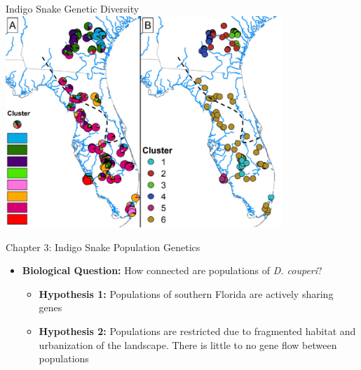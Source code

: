 \documentclass[10pt,aspectratio=169]{beamer}
\begin{document}
\begin{frame}{Indigo Snake Genetic Diversity}
  \centering  
  \includegraphics[height = 8cm]{media/indigo-snakes-genetic-clusters.png}
\end{frame}

\begin{frame}{Chapter 3: Indigo Snake Population Genetics}
      \begin{itemize}
       \item \textbf{Biological Question:} How connected are populations of \textit{D. couperi}?
        \begin{itemize}
          \item \textbf{Hypothesis 1:} Populations of southern Florida are actively sharing genes
          \item \textbf{Hypothesis 2:} Populations are restricted due to fragmented habitat and urbanization of the landscape. There is little to no gene flow between populations 
        \end{itemize}
      \end{itemize}  
\end{frame}
\end{document}
